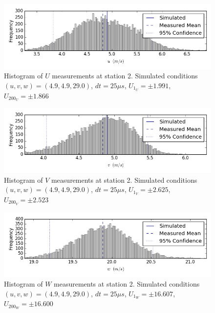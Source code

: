\begin{figure}[H]
\centering
\includegraphics[width=6in]{figs/Ely_May28th02001/uncertainty_Ely_May28th02001_U}
\caption{Histogram of $U$ measurements at station 2. Simulated conditions $(u,v,w)=(4.9, 4.9, 29.0)$, $dt=25 \mu s$, $U_{1_{U}}=\pm 1.991$, $U_{200_{U}}=\pm 1.866$}
\label{fig:uncertainty_Ely_May28th02001_U}
\end{figure}


\begin{figure}[H]
\centering
\includegraphics[width=6in]{figs/Ely_May28th02001/uncertainty_Ely_May28th02001_V}
\caption{Histogram of $V$ measurements at station 2. Simulated conditions $(u,v,w)=(4.9, 4.9, 29.0)$, $dt=25 \mu s$, $U_{1_{V}}=\pm 2.625$, $U_{200_{V}}=\pm 2.523$}
\label{fig:uncertainty_Ely_May28th02001_V}
\end{figure}


\begin{figure}[H]
\centering
\includegraphics[width=6in]{figs/Ely_May28th02001/uncertainty_Ely_May28th02001_W}
\caption{Histogram of $W$ measurements at station 2. Simulated conditions $(u,v,w)=(4.9, 4.9, 29.0)$, $dt=25 \mu s$, $U_{1_{W}}=\pm 16.607$, $U_{200_{W}}=\pm 16.600$}
\label{fig:uncertainty_Ely_May28th02001_W}
\end{figure}


